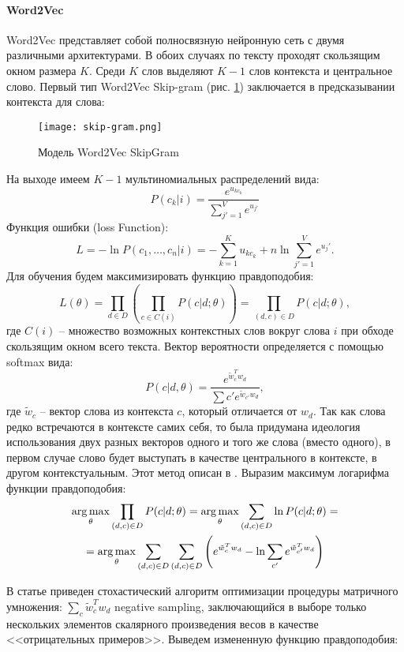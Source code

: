 \paragraph{Word2Vec}
\par
Word2Vec представляет собой полносвязную нейронную сеть с двумя различными архитектурами. В обоих случаях по тексту проходят скользящим окном размера $K$. Среди $K$ слов выделяют $K-1$ слов контекста и центральное слово. Первый тип Word2Vec Skip-gram (рис. \ref{fig:skipgram}) заключается в предсказывании контекста для слова:
\begin{figure}[H]
    \centering
    \texttt{[image: skip-gram.png]}
    \caption{Модель Word2Vec SkipGram \cite{mikolov2013distributed}}
    \label{fig:skipgram}
\end{figure}
\par
На выходе имеем $K-1$ мультиномиальных распределений вида:
\[P(c_k|i) = \dfrac{e^{u_{kc_k}}}{\sum\limits_{j'=1}^V e^{u_{j'}}}\]
Функция ошибки (loss Function):
\[L = -\ln P\left(c_1, \ldots, c_n| i\right) = -\sum\limits_{k=1}^{K}u_{kc_{k}} + n\ln\sum\limits_{j'=1}^V e^{u_j'}.\]
Для обучения будем максимизировать функцию правдоподобия:
\[L(\theta) = \prod_{d \in D}\left(\prod_{c \in C(i)} P(c|d; \theta)\right) = \prod_{\left(d,c\right) \in D} P(c|d; \theta),\]
где $C(i)$ -- множество возможных контекстных слов вокруг слова $i$ при обходе скользящим окном всего текста. Вектор вероятности определяется с помощью softmax вида:
\[P(c|d, \theta) = \dfrac{e^{\tilde w_c^Tw_d}}{\sum\limits{c'}e^{\tilde w_{c'}w_d}},\]
где $\tilde{w}_c$ -- вектор слова из контекста $c$, который отличается от $w_d$. Так как слова редко встречаются в контексте самих себя, то была придумана идеология использования двух разных векторов одного и того же слова (вместо одного), в первом случае слово будет выступать в качестве центрального в контексте, в другом контекстуальным. Этот метод описан в \cite{skipgram}. Выразим максимум логарифма функции правдоподобия:
\begin{gather*}
    \operatorname*{arg\,max}\limits_{\theta} \prod_{(d,c)\in D} P(c|d;\theta) = \operatorname*{arg\,max}\limits_{\theta} \sum\limits_{(d, c) \in D} \ln P(c|d; \theta ) =\\
    =  \operatorname*{arg\,max}\limits_{\theta} \sum\limits_{(d,c)\in D} \sum\limits_{(d,c) \in D} \left(e^{\tilde{w}^T_cw_d} - \ln \sum\limits_{c'} e^{\tilde{w}_{c'}^Tw_d}\right)
\end{gather*}
\par
В статье \cite{cbow} приведен стохастический алгоритм оптимизации процедуры матричного умножения: $\sum\limits_{c} \tilde{w}_c^Tw_d$ negative sampling, заключающийся в выборе только нескольких элементов скалярного произведения весов  в качестве <<отрицательных примеров>>. Выведем измененную функцию правдоподобия:

